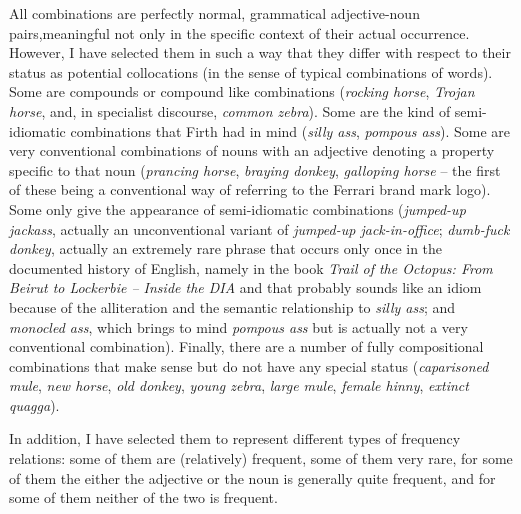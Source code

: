 
All combinations are perfectly normal, grammatical adjective\hyp{}noun  pairs,\linebreak meaningful not only in the specific context of their actual occurrence. However, I have selected them in such a way that they differ with respect to their status as potential collocations  (in the sense of typical combinations of words). Some are compounds or compound like combinations (\textit{rocking horse}, \textit{Trojan horse}, and, in specialist discourse, \textit{common zebra}). Some are the kind of semi\hyp{}idiomatic  combinations that Firth had in mind (\textit{silly ass}, \textit{pompous ass}). Some are very conventional  combinations of nouns  with an adjective  denoting a property specific to that noun (\textit{prancing horse}, \textit{braying donkey}, \textit{galloping horse} -- the first of these being a conventional  way of referring to the Ferrari brand mark logo). Some only give the appearance of semi\hyp{}idiomatic  combinations (\textit{jumped-up jackass}, actually an unconventional variant of \textit{jumped-up jack-in-office}; \textit{dumb-fuck donkey}, actually an extremely rare phrase that occurs only once in the documented history of English, namely in the book \textit{Trail of the Octopus: From Beirut to Lockerbie -- Inside the DIA} and that probably sounds like an idiom  because of the alliteration and the semantic  relationship to \textit{silly ass}; and \textit{monocled ass}, which brings to mind \textit{pompous ass} but is actually not a very conventional  combination). Finally, there are a number of fully compositional  combinations that make sense but do not have any special status (\textit{caparisoned mule}, \textit{new horse}, \textit{old donkey}, \textit{young zebra}, \textit{large mule}, \textit{female hinny}, \textit{extinct quagga}).

In addition, I have selected them to represent different types of frequency  relations: some of them are (relatively) frequent, some of them very rare, for some of them the either the adjective  or the noun  is generally quite frequent, and for some of them neither of the two is frequent.

